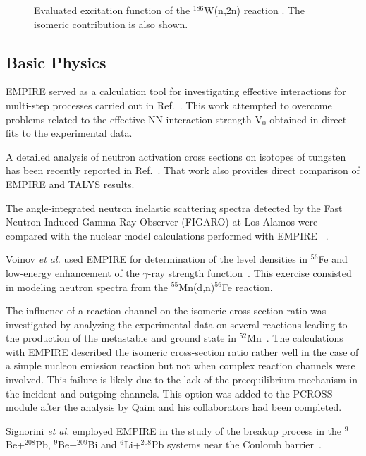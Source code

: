 \bigskip
\begin{figure}[tbph]
\caption{Evaluated excitation function of the $^{186}$W(n,2n) reaction
\protect\cite{catrko07}. The isomeric contribution is also shown.}
\label{w186_n2n_isomer}
\end{figure}
\bigskip


\subsection{Basic Physics}

EMPIRE served as a calculation tool for investigating effective interactions
for multi-step processes carried out in Ref.~\cite{avrigeanu2001eim}. This
work attempted to overcome problems related to the effective NN-interaction
strength V$_{0}$ obtained in direct fits to the experimental data.

A detailed analysis of neutron activation cross sections on isotopes of
tungsten has been recently reported in Ref.~\cite{Avrigeanu:06}. That work
also provides direct comparison of EMPIRE and TALYS results.

The angle-integrated neutron inelastic scattering spectra detected by the
Fast Neutron-Induced Gamma-Ray Observer (FIGARO) at Los Alamos were compared
with the nuclear model calculations performed with EMPIRE~%
\cite{rochman2004nir}.

Voinov \textit{et al.} used EMPIRE for determination of the level densities
in $^{56}$Fe and low-energy enhancement of the $\gamma$-ray strength
function~\cite{Voinov:06}. This exercise consisted in modeling neutron
spectra from the $^{55}$Mn(d,n)$^{56}$Fe reaction.

The influence of a reaction channel on the isomeric cross-section ratio was
investigated by analyzing the experimental data on several reactions leading
to the production of the metastable and ground state in $^{52}$Mn~\cite%
{Qaim:05}. The calculations with EMPIRE described the isomeric cross-section
ratio rather well in the case of a simple nucleon emission reaction but not
when complex reaction channels were involved. This failure is likely due to
the lack of the preequilibrium mechanism in the incident and outgoing
channels. This option was added to the PCROSS module after the analysis by
Qaim and his collaborators had been completed.

Signorini \textit{et al.} employed EMPIRE in the study of the breakup process
in the $^9$Be+$^{208}$Pb, $^9$Be+$^{209}$Bi and $^6$Li+$^{208}$Pb systems
near the Coulomb barrier~\cite{signorini2004bps}.

